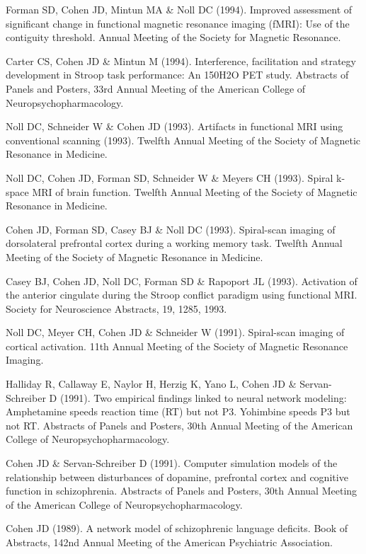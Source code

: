 \documentclass[10 pt]{article}
\begin{document}
Forman SD, Cohen JD, Mintun MA \& Noll DC (1994). Improved assessment of significant change in functional magnetic resonance imaging (fMRI): Use of the contiguity threshold. Annual Meeting of
the Society for Magnetic Resonance.

Carter CS, Cohen JD \& Mintun M (1994). Interference, facilitation and strategy development in Stroop task performance: An 150H2O PET study. Abstracts of Panels and Posters, 33rd Annual Meeting of the American College of Neuropsychopharmacology.

Noll DC, Schneider W \& Cohen JD (1993). Artifacts in functional MRI using conventional scanning (1993). Twelfth Annual Meeting of the Society of Magnetic Resonance in Medicine.

Noll DC, Cohen JD, Forman SD, Schneider W \& Meyers CH (1993). Spiral k-space MRI of brain function. Twelfth Annual Meeting of the Society of Magnetic Resonance in Medicine.

Cohen JD, Forman SD, Casey BJ \& Noll DC (1993). Spiral-scan imaging of dorsolateral prefrontal cortex during a working memory task. Twelfth Annual Meeting of the Society of Magnetic Resonance in Medicine.

Casey BJ, Cohen JD, Noll DC, Forman SD \& Rapoport JL (1993). Activation of the anterior cingulate during the Stroop conflict paradigm using functional MRI. Society for Neuroscience Abstracts, 19, 1285, 1993.

Noll DC, Meyer CH, Cohen JD \& Schneider W (1991). Spiral-scan imaging of cortical activation. 11th Annual Meeting of the Society of Magnetic Resonance Imaging.

Halliday R, Callaway E, Naylor H, Herzig K, Yano L, Cohen JD \& Servan-Schreiber D (1991). Two empirical findings linked to neural network modeling: Amphetamine speeds reaction time (RT) but not P3. Yohimbine speeds P3 but not RT. Abstracts of Panels and Posters, 30th Annual Meeting of the American College of Neuropsychopharmacology.

Cohen JD \& Servan-Schreiber D (1991). Computer simulation models of the relationship between disturbances of dopamine, prefrontal cortex and cognitive function in schizophrenia. Abstracts of Panels and Posters, 30th Annual Meeting of the American College of Neuropsychopharmacology.

Cohen JD (1989). A network model of schizophrenic language deficits. Book of Abstracts, 142nd Annual Meeting of the American Psychiatric Association.
    \smallskip


\end{document}
